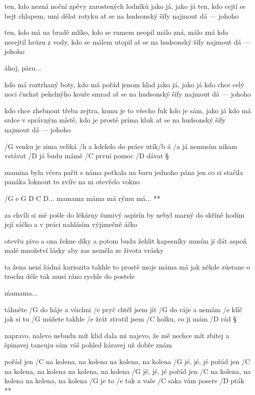 ten, kdo nezná noční zpěvy zarostených lodníků
jako já, jako já
ten, kdo cejtí se bejt chlapem, umí dělat rotyku
ať se na hudsonský šífy najmout dá --- johoho \s

ten, kdo má na bradě mlíko, kdo se rumem neopil
málo zná, málo zná
kdo necejtil hrůzu z vody, kdo se málem utopil
ať se na hudsonský šífy najmout dá --- johoho

\r ahoj, páru...

kdo má roztrhaný boty, kdo má pořád jenom hlad
jako já, jako já
kdo chce celý noci čuchat pekelnýho kouře smrad
ať se na hudsonský šífy najmout dá --- johoho \s

kdo chce zhebnout třeba zejtra, komu je to všecho fuk
kdo je sám, jako já
kdo má srdce v správným místě, kdo je prostě príma kluk
ať se na hudsonský šífy najmout dá --- johoho

\rr




/G venku je zima veliká
/h a kdekdo do práce utík/b á
/a já nemusím nikam vstávat
/D já budu mámě /C první pomoc /D dávat \S

mamina byla včera pařit s náma
potkala na baru jednoho pána
jen co si stačila panáka loknout
to zvíře na ni otevřelo vokno

\R  /{G e G D C D...} mamama máma má rýmu má... **

za chvíli si mě pošle do lékárny
šumivý aspirín by nebyl marný
do skříně hodím její sáčko
a v práci nahlásím výjimečně áčko \s

otevřu pivo a ona řekne díky
a potom budu žehlit kapesníky
musím jí dát aspoň malé množství lásky
aby zas neměla ze života vrásky \s

ta žena není žádná kuriozita
takhle to prostě moje máma má
jak někde zůstane o trochu déle
tak musí ráno rychle do postele

\r mamama...




táhněte /G do háje a všichni /e pryč
chtěl jsem jít /G do ráje a nemám /e klíč
jak si tu /G můžete takhle /e žrát
ztratil jsem /C holku, co ji mám /D rád \S

napravo, nalevo nebudu mít klid
dala mi najevo, že mě nechce mít
zbitej a špinavej tancuju sám
váš pohled káravej už dobře znám

\R  pořád jen /C na kolena, na kolena
    na kolena, na kolena /G jé, jé, jé 
    pořád jen /C na kolena, na kolena
    na kolena, na kolena /G jé, jé, jé
    pořád jen /C na kolena, na kolena
    na kolena, na kolena /G je to /e tak
    a vaše /C saka vám posere /D pták **

